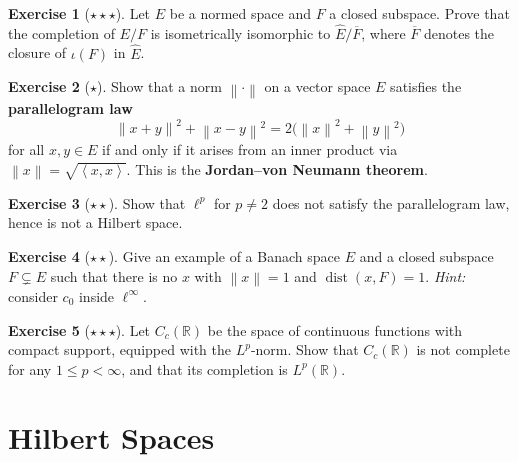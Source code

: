 \documentclass[a4paper,12pt]{book}
\DeclareMathOperator{\dist}{dist}
\newcommand{\R}{\mathbb{R}}
\newcommand{\norm}[1]{\left\| #1 \right\|}
\newcommand{\inner}[2]{\left\langle #1, #2 \right\rangle}
\theoremstyle{definition}
\newtheorem{exercise}{Exercise}[chapter]
\theoremstyle{plain}
\theoremstyle{remark}
\begin{document}
\begin{exercise}[$\star\star\star$]
\label{exo:quotient-completion}
Let $E$ be a normed space and $F$ a closed subspace.  Prove that the
completion of $E/F$ is isometrically isomorphic to $\widehat{E}/\overline{F}$,
where $\overline{F}$ denotes the closure of $\iota(F)$ in $\widehat{E}$.
\end{exercise}

\begin{exercise}[$\star$]
\label{exo:parallelogram}
Show that a norm $\norm{\cdot}$ on a vector space $E$ satisfies the
\textbf{parallelogram law}
\[
  \norm{x+y}^2 + \norm{x-y}^2 = 2\bigl(\norm{x}^2+\norm{y}^2\bigr)
\]
for all $x,y\in E$ if and only if it arises from an inner product via
$\norm{x}=\sqrt{\inner{x}{x}}$.  This is the
\textbf{Jordan--von Neumann theorem}.
\end{exercise}

\begin{exercise}[$\star\star$]
\label{exo:banach-not-hilbert}
Show that $\ell^p$ for $p\ne 2$ does not satisfy the parallelogram law,
hence is not a Hilbert space.
\end{exercise}

\begin{exercise}[$\star\star$]
\label{exo:riesz-lemma-not-one}
Give an example of a Banach space $E$ and a closed subspace $F\subsetneq E$
such that there is no $x$ with $\norm{x}=1$ and $\dist(x,F)=1$.
\textit{Hint:} consider $c_0$ inside $\ell^\infty$.
\end{exercise}

\begin{exercise}[$\star\star\star$]
\label{exo:completion-Lp}
Let $C_c(\R)$\index{Cc@$C_c(\R)$} be the space of continuous functions
with compact support, equipped with the $L^p$-norm.  Show that $C_c(\R)$
is not complete for any $1\le p<\infty$, and that its completion is
$L^p(\R)$.
\end{exercise}

\chapter{Hilbert Spaces}
\label{ch:hilbert}
\minitoc\bigskip
\end{document}
